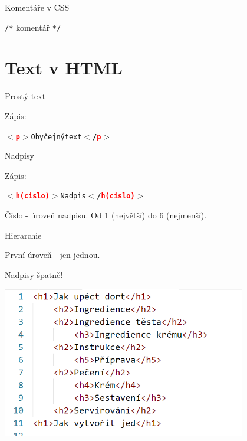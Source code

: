 \documentclass[aspectratio=1610]{beamer}
\begin{document}
\begin{frame}{Komentáře v CSS}
    \begin{cardTiny}
        \begin{center}
        \texttt{/*} komentář \texttt{*/}
        \end{center}
    \end{cardTiny}
\end{frame}


\section{Text v HTML}
\begin{frame}{Prostý text}
    \begin{cardTiny}
        \begin{flushleft}
            Zápis: \begin{alltt}\textbf{$<$\textcolor{red}{p}$>$}Obyčejný text\textbf{$<$/\textcolor{red}{p}$>$}\end{alltt}
        \end{flushleft}
    \end{cardTiny}
\end{frame}

\begin{frame}{Nadpisy}
    \begin{cardTiny}
        \begin{flushleft}
            Zápis: \begin{alltt}\textbf{$<$\textcolor{red}{h}\textcolor{red}{(cislo)}$>$}Nadpis\textbf{$<$/\textcolor{red}{h}\textcolor{red}{(cislo)}$>$}\end{alltt}
        
            Číslo - úroveň nadpisu. Od 1 (největší) do 6 (nejmenší).

            Hierarchie

            První úroveň - jen jednou.
        \end{flushleft}
    \end{cardTiny}
\end{frame}

\begin{frame}{Nadpisy špatně!}
    \begin{center}
        \includegraphics[width=0.8\textwidth]{img/html-cake-bad.png}
    \end{center}
\end{frame}
\end{document}
